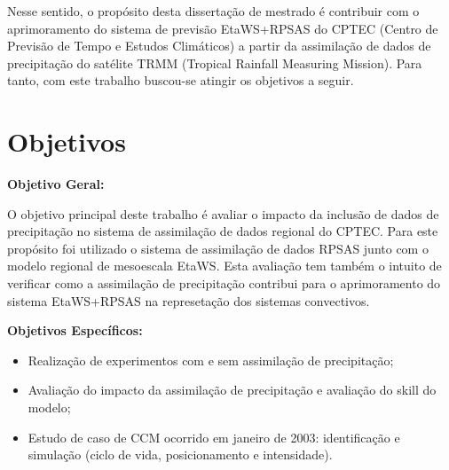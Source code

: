 Nesse sentido, o propósito desta dissertação de mestrado é contribuir com o aprimoramento do sistema de previsão EtaWS+RPSAS do CPTEC (Centro de Previsão de Tempo e Estudos Climáticos) a partir da assimilação de dados de precipitação do satélite TRMM (Tropical Rainfall Measuring Mission). Para tanto, com este trabalho buscou-se atingir os objetivos a seguir.

\section{Objetivos}
\label{ss:objetivos} 

\textbf{Objetivo Geral:}

O objetivo principal deste trabalho é avaliar o impacto da inclusão de dados de precipitação no sistema de assimilação de dados regional do CPTEC. Para este propósito foi utilizado o sistema de assimilação de dados RPSAS junto com o modelo regional de mesoescala EtaWS. Esta avaliação tem também o intuito de verificar como a assimilação de precipitação contribui para o aprimoramento do sistema EtaWS+RPSAS na represetação dos sistemas convectivos.

\textbf{Objetivos Específicos:}

\begin{itemize}
\item Realização de experimentos com e sem assimilação de precipitação;
\item Avaliação do impacto da assimilação de precipitação e avaliação do skill do modelo;
\item Estudo de caso de CCM ocorrido em janeiro de 2003: identificação e simulação (ciclo de vida, posicionamento e intensidade).
\end{itemize}
